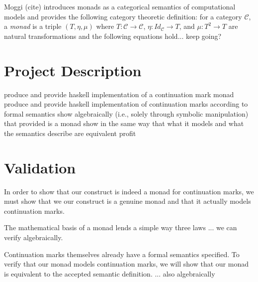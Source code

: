 \documentclass[ms]{byuprop}
\begin{document}
Moggi (cite) introduces monads as a categorical semantics of computational models and provides the following category theoretic definition: for a category $\mathcal{C}$, a \emph{monad} is a triple $(T,\eta,\mu)$ where $T:\mathcal{C}\rightarrow\mathcal{C}$, $\eta:Id_{\mathcal{C}}\rightarrow T$, and $\mu:T^{2}\rightarrow T$ are natural transformations and the following equations hold... keep going?








\section{Project Description}

produce and provide haskell implementation of a continuation mark monad
produce and provide haskell implementation of continuation marks according to formal semantics
show algebraically (i.e., solely through symbolic manipulation) that provided is a monad
show in the same way that what it models and what the semantics describe are equivalent
profit

\section{Validation}


In order to show that our construct is indeed a monad for continuation marks, we must show that we our construct is a genuine monad and that it actually models continuation marks.

The mathematical basis of a monad lends a simple way three laws ... we can verify algebraically.

Continuation marks themselves already have a formal semantics specified. To verify that our monad models continuation marks, we will show that our monad is equivalent to the accepted semantic definition. ... also algebraically
\end{document}

